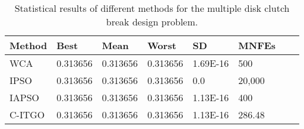 
\begin{table*}[tp]
    \tiny
    \begin{center}
    
    \begin{tabular}{ P{2.0cm} P{2.0cm} P{2.0cm} P{2.0cm} P{2.0cm} P{2.0cm} P{2.0cm} P{2.0cm}  }
    \hline
    \textbf{Method} & \textbf{Best} & \textbf{Mean} & \textbf{Worst} & \textbf{SD} & \textbf{MNFEs} \\
    \hline

    WCA & 0.313656 & 0.313656 & 0.313656 & 1.69E-16 & 500 \\
    IPSO & 0.313656 & 0.313656 & 0.313656 & 0.0 & 20,000 \\
    IAPSO & 0.313656 & 0.313656 & 0.313656 & 1.13E-16 & 400 \\
    C-ITGO & 0.313656 & 0.313656 & 0.313656 & 1.13E-16 & 286.48 \\

    \hline
    \end{tabular}
    \end{center}
    
    \caption{ Statistical results of different methods for the multiple disk clutch break design problem. \\[1em]}
    \label{tab:MD}
    \end{table*}
    
    